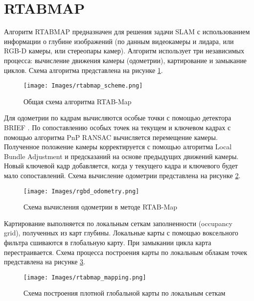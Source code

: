 \documentclass{mipt-thesis-bs}
\begin{document}
\section{RTABMAP}
\label{section_rtabmap}

Алгоритм RTABMAP \cite{labbe2011memory} предназначен для решения задачи SLAM с использованием информации о глубине изображений (по данным видеокамеры и лидара, или RGB-D камеры, или стереопары камер). Алгоритм использует три независимых процесса: вычисление движения камеры (одометрии), картирование и замыкание циклов. Схема алгоритма представлена на рисунке \ref{figurertabmap}.\\

\begin{figure}
	\centering
	\texttt{[image: Images/rtabmap\_scheme.png]}
	\caption{Общая схема алгоритма RTAB-Map}
	\label{figurertabmap}
\end{figure}

Для одометрии по кадрам вычисляются особые точки с помощью детектора BRIEF \cite{calonder2010brief}. По сопоставлению особых точек на текущем и ключевом кадрах с помощью алгоритма PnP RANSAC \cite{brachmann2017dsac} вычисляется перемещение камеры. Полученное положение камеры корректируется с помощью алгоритма Local Bundle Adjustment \cite{zhang2006incremental} и предсказаний на основе предыдущих движений камеры. Новый ключевой кадр добавляется, когда у текущего кадра и ключевого будет мало сопоставлений. Схема вычисление одометрии представлена на рисунке \ref{figurergbdodometry}.\\

\begin{figure}
	\centering
	\texttt{[image: Images/rgbd\_odometry.png]}
	\caption{Схема вычисления одометрии в методе RTAB-Map}
	\label{figurergbdodometry}
\end{figure}

Картирование выполняется по локальным сеткам заполненности (occupancy grid), полученных из карт глубины. Локальные карты с помощью воксельного фильтра сшиваются в глобальную карту. При замыкании цикла карта перестраивается. Схема процесса построения карты по локальным облакам точек представлена на рисунке \ref{figuremapping}.

\begin{figure}
	\centering
	\texttt{[image: Images/rtabmap\_mapping.png]}
	\caption{Схема построения плотной глобальной карты по локальным сеткам}
	\label{figuremapping}
\end{figure}
\end{document}
